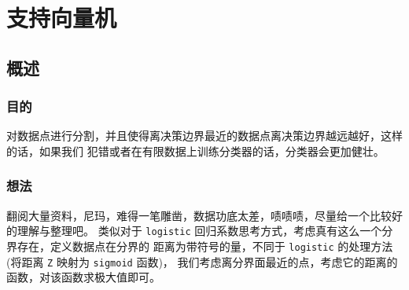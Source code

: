 \documentclass[11pt]{ctexart}
\begin{document}
\section{支持向量机}
\label{sec:orgheadline80}
\subsection{概述}
\label{sec:orgheadline79}
\subsubsection{目的}
\label{sec:orgheadline67}
对数据点进行分割，并且使得离决策边界最近的数据点离决策边界越远越好，这样的话，如果我们
犯错或者在有限数据上训练分类器的话，分类器会更加健壮。
\subsubsection{想法}
\label{sec:orgheadline78}
翻阅大量资料，尼玛，难得一笔雕凿，数据功底太差，啧啧啧，尽量给一个比较好的理解与整理吧。
类似对于 \texttt{logistic} 回归系数思考方式，考虑真有这么一个分界存在，定义数据点在分界的
距离为带符号的量，不同于 \texttt{logistic} 的处理方法(将距离 \texttt{Z} 映射为 \texttt{sigmoid} 函数)，
我们考虑离分界面最近的点，考虑它的距离的函数，对该函数求极大值即可。
\end{document}
